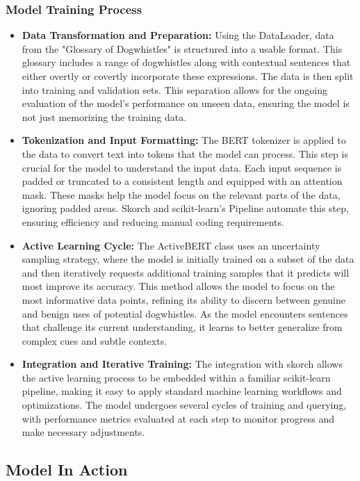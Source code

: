 \documentclass[11pt,a4paper]{article}
\begin{document}
\subsubsection{Model Training Process}
\begin{itemize}
    \item \textbf{Data Transformation and Preparation:} Using the DataLoader, data from the "Glossary of Dogwhistles" is structured into a usable format. This glossary includes a range of dogwhistles along with contextual sentences that either overtly or covertly incorporate these expressions. The data is then split into training and validation sets. This separation allows for the ongoing evaluation of the model’s performance on unseen data, ensuring the model is not just memorizing the training data.
    \item \textbf{Tokenization and Input Formatting:} The BERT tokenizer is applied to the data to convert text into tokens that the model can process. This step is crucial for the model to understand the input data. Each input sequence is padded or truncated to a consistent length and equipped with an attention mask. These masks help the model focus on the relevant parts of the data, ignoring padded areas. Skorch and scikit-learn's Pipeline automate this step, ensuring efficiency and reducing manual coding requirements.
    \item \textbf{Active Learning Cycle:} The ActiveBERT class uses an uncertainty sampling strategy, where the model is initially trained on a subset of the data and then iteratively requests additional training samples that it predicts will most improve its accuracy. This method allows the model to focus on the most informative data points, refining its ability to discern between genuine and benign uses of potential dogwhistles. As the model encounters sentences that challenge its current understanding, it learns to better generalize from complex cues and subtle contexts.
    \item \textbf{Integration and Iterative Training:} The integration with skorch allows the active learning process to be embedded within a familiar scikit-learn pipeline, making it easy to apply standard machine learning workflows and optimizations. The model undergoes several cycles of training and querying, with performance metrics evaluated at each step to monitor progress and make necessary adjustments.
\end{itemize}

\subsection{Model In Action}
\end{document}
